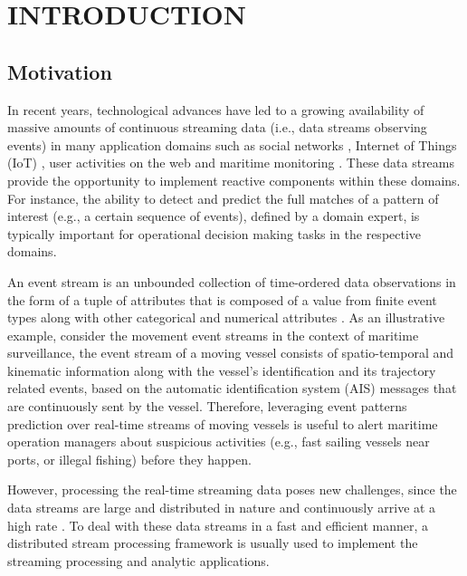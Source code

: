\chapter{INTRODUCTION}


\section{Motivation}
\par In recent years, technological advances have led to a growing availability of massive amounts of continuous streaming data (i.e., data streams observing events) in many application domains such as social networks \cite{reuter2012event,mathioudakis2010twittermonitor}, Internet of Things (IoT) \cite{miorandi2012internet}, user activities on the web \cite{banerjee2001clickstream,metwally2005duplicate} and maritime monitoring \cite{patroumpas2015event,laxhammar2010conformal}. These data streams provide the opportunity to implement reactive components within these domains.  For instance, the ability to detect and predict the full matches of a pattern of interest (e.g., a certain sequence of events), defined by a domain expert, is typically important for operational decision making tasks in the respective domains.

\par An event stream is an unbounded collection of time-ordered data observations in the form of a tuple of attributes that is composed of a value from finite event types along with other categorical and numerical attributes \cite{agrawal2008efficient,schultz2009distributed,zhou_pattern_2015}. As an illustrative example, consider the movement event streams in the context of maritime surveillance, the event stream of a moving vessel consists of spatio-temporal and kinematic information along with the vessel's identification and its trajectory related events, based on the automatic identification system (AIS) \cite{ais} messages that are continuously sent by the vessel. Therefore, leveraging event patterns prediction over real-time streams of moving vessels is useful to alert maritime operation managers about suspicious activities (e.g., fast sailing vessels near ports, or illegal fishing) before they happen. 

\par However, processing the real-time streaming data poses new challenges, since the data streams are large and distributed in nature and continuously arrive at a high rate \cite{Babcock2002,Flouris2017}. To deal with these data streams in a fast and efficient manner, a distributed stream processing framework \cite{Spark,Flink,Storm} is usually used to implement the streaming processing and analytic applications. 


